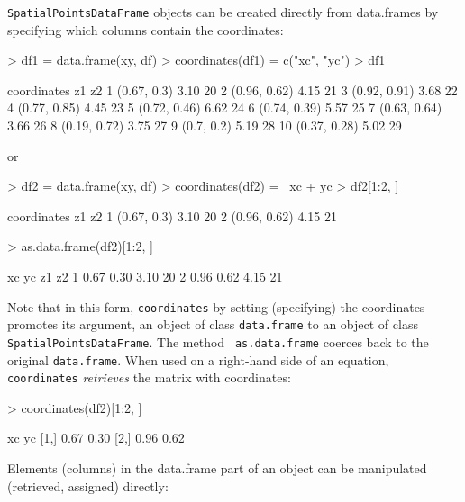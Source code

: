 \documentclass{article}
\begin{document}
{\tt SpatialPointsDataFrame} objects can be created directly from 
data.frames by specifying which columns contain the coordinates:
\begin{Schunk}
\begin{Sinput}
> df1 = data.frame(xy, df)
> coordinates(df1) = c("xc", "yc")
> df1
\end{Sinput}
\begin{Soutput}
    coordinates   z1 z2
1   (0.67, 0.3) 3.10 20
2  (0.96, 0.62) 4.15 21
3  (0.92, 0.91) 3.68 22
4  (0.77, 0.85) 4.45 23
5  (0.72, 0.46) 6.62 24
6  (0.74, 0.39) 5.57 25
7  (0.63, 0.64) 3.66 26
8  (0.19, 0.72) 3.75 27
9    (0.7, 0.2) 5.19 28
10 (0.37, 0.28) 5.02 29
\end{Soutput}
\end{Schunk}
or
\begin{Schunk}
\begin{Sinput}
> df2 = data.frame(xy, df)
> coordinates(df2) = ~xc + yc
> df2[1:2, ]
\end{Sinput}
\begin{Soutput}
   coordinates   z1 z2
1  (0.67, 0.3) 3.10 20
2 (0.96, 0.62) 4.15 21
\end{Soutput}
\begin{Sinput}
> as.data.frame(df2)[1:2, ]
\end{Sinput}
\begin{Soutput}
    xc   yc   z1 z2
1 0.67 0.30 3.10 20
2 0.96 0.62 4.15 21
\end{Soutput}
\end{Schunk}
Note that in this form, {\tt coordinates} by setting (specifying) the
coordinates promotes its argument, an object of class {\tt data.frame}
to an object of class {\tt SpatialPointsDataFrame}. The method {\tt
as.data.frame} coerces back to the original {\tt data.frame}. When used
on a right-hand side of an equation, {\tt coordinates} {\em retrieves}
the matrix with coordinates:
\begin{Schunk}
\begin{Sinput}
> coordinates(df2)[1:2, ]
\end{Sinput}
\begin{Soutput}
       xc   yc
[1,] 0.67 0.30
[2,] 0.96 0.62
\end{Soutput}
\end{Schunk}
Elements (columns) in the data.frame part of an object can be manipulated
(retrieved, assigned) directly:
\end{document}
